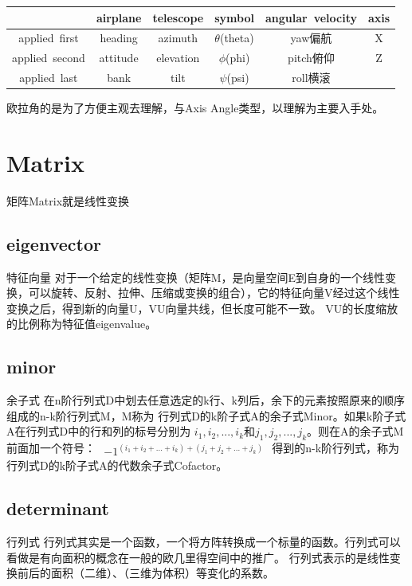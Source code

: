 \begin{tabular}{|c|c|c|c|c|c|}
    \hline
  & airplane & telescope & symbol & \hbox{angular velocity} & axis \\ \hline
 \hbox{applied first} & heading & azimuth & \hbox{$\theta$(theta)} & \hbox{yaw偏航} & X \\ \hline
 \hbox{applied second} & attitude & elevation & \hbox{$\phi$(phi)} & \hbox{pitch俯仰} & Z \\ \hline
 \hbox{applied last} & bank & tilt & \hbox{$\psi$(psi)} & \hbox{roll横滚} \\ \hline
\end{tabular}
 
欧拉角的是为了方便主观去理解，与Axis Angle类型，以理解为主要入手处。



\section{ Matrix }

矩阵Matrix就是线性变换

\subsection{eigenvector}
特征向量
对于一个给定的线性变换（矩阵M，是向量空间E到自身的一个线性变换，可以旋转、反射、拉伸、压缩或变换的组合），它的特征向量V经过这个线性变换之后，得到新的向量U，VU向量共线，但长度可能不一致。
VU的长度缩放的比例称为特征值eigenvalue。

\subsection{minor}
余子式
在n阶行列式D中划去任意选定的k行、k列后，余下的元素按照原来的顺序组成的n-k阶行列式M，M称为
行列式D的k阶子式A的余子式Minor。如果k阶子式A在行列式D中的行和列的标号分别为
$i_{1},i_{2},...,i_{k}$和$j_{1},j_{2},...,j_{k}$。则在A的余子式M前面加一个符号：
\begin{math}
    \begin{aligned}
        {-1}^{(i_{1}+i_{2}+...+i_{k}) + (j_{1}+j_{2}+...+j_{k})}
    \end{aligned}
\end{math}
得到的n-k阶行列式，称为行列式D的k阶子式A的代数余子式Cofactor。

\subsection{determinant}
行列式
行列式其实是一个函数，一个将方阵转换成一个标量的函数。行列式可以看做是有向面积的概念在一般的欧几里得空间中的推广。
行列式表示的是线性变换前后的面积（二维）、（三维为体积）等变化的系数。

